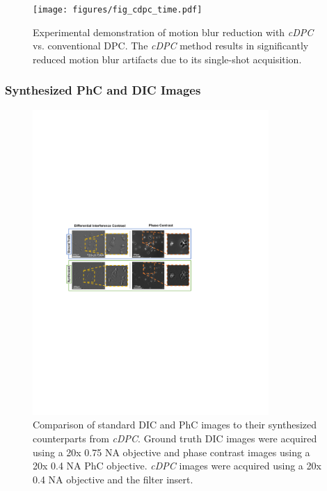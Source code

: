 \begin{figure}[tbh]
\centering
\texttt{[image: figures/fig\_cdpc\_time.pdf]}
\caption{\label{fig:temporalRes}
Experimental demonstration of motion blur reduction with \textit{cDPC} vs. conventional DPC. The \textit{cDPC} method results in significantly reduced motion blur artifacts due to its single-shot acquisition.}
\end{figure}

\subsubsection{Synthesized PhC and DIC Images}

\begin{figure}[tbh]
\centering
\includegraphics[width=0.8\textwidth]{figures/fig_cdpc_dic.pdf}
\caption{\label{fig:synthDIC_PC}
Comparison of standard DIC and PhC images to their synthesized counterparts from \textit{cDPC}. Ground truth DIC images were acquired using a 20x 0.75 NA objective and phase contrast images using a 20x 0.4 NA PhC objective. \textit{cDPC} images were acquired using a 20x 0.4 NA objective and the filter insert.}\end{figure}

